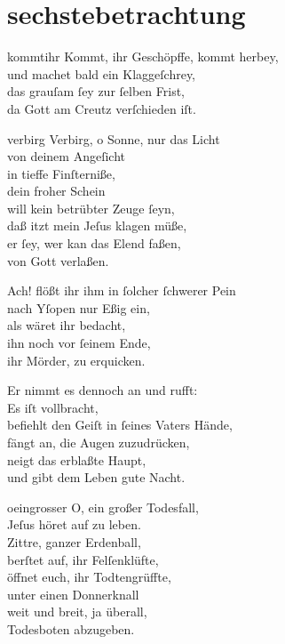 \documentclass[abbrwidth=6em,tocstyle=ref-genre,shorttitlesize=50]{ees}
\begin{document}
{\part{sechstebetrachtung}

\begin{movement}{kommtihr}
  \voice[Coro]
  Kommt, ihr Geschöpffe, kommt herbey,\\
  und machet bald ein Klaggeſchrey,\\
  das grauſam ſey zur ſelben Frist,\\
  da Gott am Creutz verſchieden iſt.
\end{movement}

\begin{movement}{verbirg}
  \voice[Alto]
  Verbirg, o Sonne, nur das Licht\\
  von deinem Angeſicht\\
  in tieffe Finſterniße,\\
  dein froher Schein\\
  will kein betrübter Zeuge ſeyn,\\
  daß itzt mein Jeſus klagen müße,\\
  er ſey, wer kan das Elend faßen,\\
  von Gott verlaßen.

  \voice[Tenore]
  Ach! flößt ihr ihm in ſolcher ſchwerer Pein\\
  nach Yſopen nur Eßig ein,\\
  als wäret ihr bedacht,\\
  ihn noch vor ſeinem Ende,\\
  ihr Mörder, zu erquicken.

  \voice[Soprano]
  Er nimmt es dennoch an und rufft:\\
  Es iſt vollbracht,\\
  befiehlt den Geiſt in ſeines Vaters Hände,\\
  fängt an, die Augen zuzudrücken,\\
  neigt das erblaßte Haupt,\\
  und gibt dem Leben gute Nacht.
\end{movement}

\begin{movement}{oeingrosser}
  \voice[Coro]
  O, ein großer Todesfall,\\
  Jeſus höret auf zu leben.\\
  Zittre, ganzer Erdenball,\\
  berſtet auf, ihr Felſenklüfte,\\
  öffnet euch, ihr Todtengrüffte,\\
  unter einen Donnerknall\\
  weit und breit, ja überall,\\
  Todesboten abzugeben.
\end{movement}

}
\end{document}
